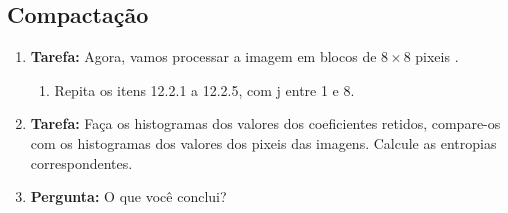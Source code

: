 \documentclass[11pt]{article}
\begin{document}
\subsection{Compactação}

\begin{enumerate}

\item \textbf{Tarefa:} Agora, vamos processar a imagem em blocos de $8\times 8$ pixeis . 

\begin{enumerate}
\item Repita os itens 12.2.1 a 12.2.5, com \textsf{j} entre 1 e 8.
\end{enumerate}

\item \textbf{Tarefa:} Faça os histogramas dos valores dos coeficientes retidos, compare-os com os histogramas dos valores dos pixeis das imagens. Calcule as entropias correspondentes.

\item \textbf{Pergunta:} O que você conclui?

\end{enumerate}
\end{document}
